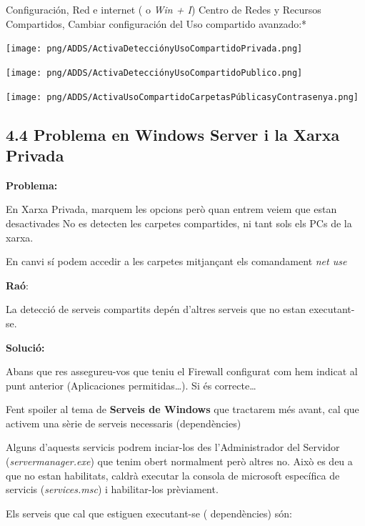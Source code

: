 \documentclass[
  a4paper,
]{article}
\begin{document}
Configuración, Red e internet ( o \emph{Win + I}) Centro de Redes y
Recursos Compartidos, Cambiar configuración del Uso compartido
avanzado:*

\texttt{[image: png/ADDS/ActivaDetecciónyUsoCompartidoPrivada.png]}

\texttt{[image: png/ADDS/ActivaDetecciónyUsoCompartidoPublico.png]}

\texttt{[image: png/ADDS/ActivaUsoCompartidoCarpetasPúblicasyContrasenya.png]}

\subsection{4.4 Problema en Windows Server i la Xarxa
Privada}\label{problema-en-windows-server-i-la-xarxa-privada}

\textbf{Problema:}

En Xarxa Privada, marquem les opcions però quan entrem veiem que estan
desactivades No es detecten les carpetes compartides, ni tant sols els
PCs de la xarxa.

En canvi sí podem accedir a les carpetes mitjançant els comandament
\emph{net use}

\textbf{Raó}:

La detecció de serveis compartits depén d'altres serveis que no estan
executant-se.

\textbf{Solució:}

Abans que res assegureu-vos que teniu el Firewall configurat com hem
indicat al punt anterior (Aplicaciones permitidas\ldots). Si és
correcte\ldots{}

Fent spoiler al tema de \textbf{Serveis de Windows} que tractarem més
avant, cal que activem una sèrie de serveis necessaris (dependències)

Alguns d'aquests servicis podrem inciar-los des l'Administrador del
Servidor (\emph{servermanager.exe}) que tenim obert normalment però
altres no. Això es deu a que no estan habilitats, caldrà executar la
consola de microsoft específica de servicis (\emph{services.msc}) i
habilitar-los prèviament.

Els serveis que cal que estiguen executant-se ( dependències) són:
\end{document}
